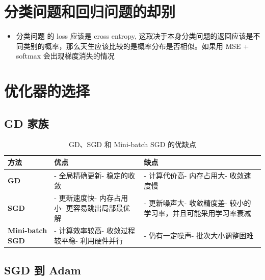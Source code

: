 \documentclass[12pt]{article}
\numberwithin{theorem}{section} %
\numberwithin{definition}{section} %
\numberwithin{assumption}{section} %
\numberwithin{lemma}{section} %
\numberwithin{remark}{section} %
\numberwithin{prop}{section} %
\numberwithin{corollary}{section} %
\numberwithin{example}{section} %
\numberwithin{question}{section} %
\numberwithin{problem}{section} %
\numberwithin{conjecture}{section} %
\numberwithin{append}{section} %
\numberwithin{property}{section} %
\begin{document}
\begin{CJK}{UTF8}{gbsn}
\section{分类问题和回归问题的却别}
\begin{itemize}
	\item 分类问题 的 loss 应该是 cross entropy, 这取决于本身分类问题的返回应该是不同类别的概率，那么天生应该比较的是概率分布是否相似。如果用 MSE + softmax 会出现梯度消失的情况
\end{itemize}

\section{优化器的选择}
\subsection{GD 家族}
\begin{table}[h]
	\centering
	\caption{GD、SGD 和 Mini-batch SGD 的优缺点}
	\begin{tabular}{@{}p{2.5cm} p{5cm} p{5cm}@{}}
		\toprule
		方法                  & 优点                                                     & 缺点                                                        \\ \midrule
		\textbf{GD}              & - 全局精确更新\newline - 稳定的收敛                          & - 计算代价高\newline - 内存占用大\newline - 收敛速度慢                \\ \midrule
		\textbf{SGD}             & - 更新速度快\newline - 内存占用小\newline - 更容易跳出局部最优解   & - 更新噪声大\newline - 收敛精度差\newline - 较小的学习率，并且可能采用学习率衰减            \\ \midrule
		\textbf{Mini-batch SGD}   & - 计算效率较高\newline - 收敛过程较平稳\newline - 利用硬件并行   & - 仍有一定噪声\newline - 批次大小调整困难                      \\ \bottomrule
	\end{tabular}
\end{table}
\subsection{SGD 到 Adam}


\end{CJK}
\end{document}
